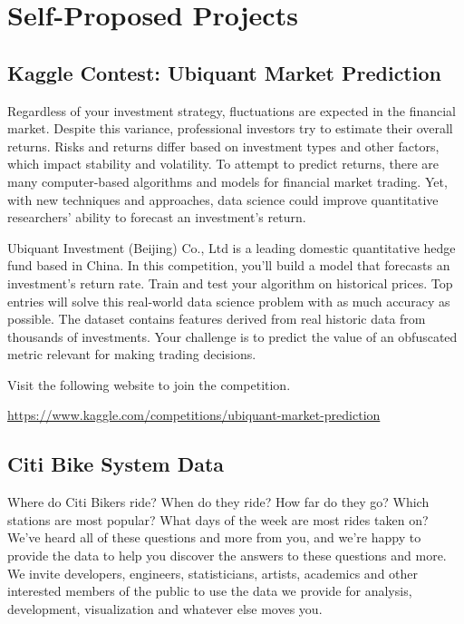 \documentclass[11pt]{article}
\begin{document}
\section{Self-Proposed Projects}

\subsection{Kaggle Contest: Ubiquant Market Prediction}

Regardless of your investment strategy, fluctuations are expected in the financial market. Despite this variance, professional investors try to estimate their overall returns. Risks and returns differ based on investment types and other factors, which impact stability and volatility. To attempt to predict returns, there are many computer-based algorithms and models for financial market trading. Yet, with new techniques and approaches, data science could improve quantitative researchers' ability to forecast an investment's return.

Ubiquant Investment (Beijing) Co., Ltd is a leading domestic quantitative hedge fund based in China. In this competition, you'll build a model that forecasts an investment's return rate. Train and test your algorithm on historical prices. Top entries will solve this real-world data science problem with as much accuracy as possible. The dataset contains features derived from real historic data from thousands of investments. Your challenge is to predict the value of an obfuscated metric relevant for making trading decisions.

Visit the following website to join the competition. 

\url{https://www.kaggle.com/competitions/ubiquant-market-prediction}



\subsection{Citi Bike System Data}

Where do Citi Bikers ride? When do they ride? How far do they go? Which stations are most popular? What days of the week are most rides taken on? We've heard all of these questions and more from you, and we're happy to provide the data to help you discover the answers to these questions and more. We invite developers, engineers, statisticians, artists, academics and other interested members of the public to use the data we provide for analysis, development, visualization and whatever else moves you.
\end{document}
